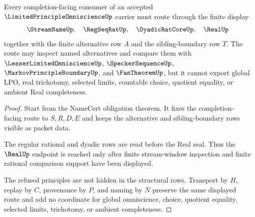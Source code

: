 \begin{theorem}
\label{thm:limited-principle-omniscience-real-completion-refusal}
Every completion-facing consumer of an accepted $\LimitedPrincipleOmniscienceUp$ carrier must route through the finite display
$$
\StreamNameUp,\quad \RegSeqRatUp,\quad \DyadicRatCoreUp,\quad \RealUp
$$
together with the finite alternative row $A$ and the sibling-boundary row $T$. The route may inspect named alternatives and compare them with $\LesserLimitedOmniscienceUp$, $\SpeckerSequenceUp$, $\MarkovPrincipleBoundaryUp$, and $\FanTheoremUp$, but it cannot export global LPO, real trichotomy, selected limits, countable choice, quotient equality, or ambient Real completeness.
\end{theorem}
\begin{proof}
Start from the NameCert obligation theorem. It fixes the completion-facing route to $S,R,D,E$ and keeps the alternative and sibling-boundary rows visible as packet data.

The regular rational and dyadic rows are read before the Real seal. Thus the $\RealUp$ endpoint is reached only after finite stream-window inspection and finite rational comparison support have been displayed.

The refused principles are not hidden in the structural rows. Transport by $H$, replay by $C$, provenance by $P$, and naming by $N$ preserve the same displayed route and add no coordinate for global omniscience, choice, quotient equality, selected limits, trichotomy, or ambient completeness.
\end{proof}


\begin{closurestatus}{\LimitedPrincipleOmniscienceUp}
  \theoryclosure{\seedClosure}
  \formalstatus{\unformalizedV}
\end{closurestatus}
